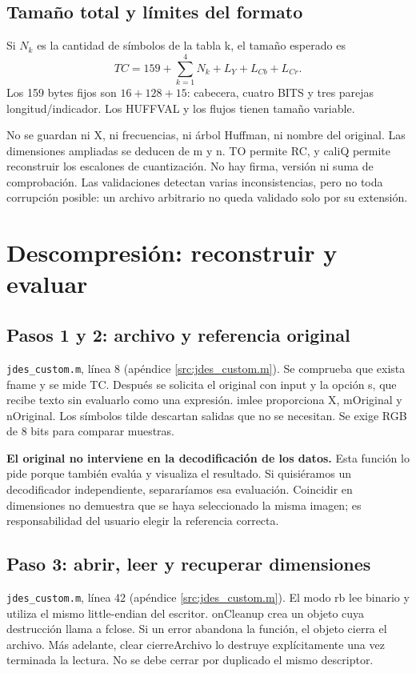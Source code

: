 \documentclass[11pt,a4paper,oneside]{report}
\begin{document}
\section{Tamaño total y límites del formato}

Si $N_k$ es la cantidad de símbolos de la tabla k, el tamaño esperado es
\[
TC=159+\sum_{k=1}^{4}N_k+L_Y+L_{Cb}+L_{Cr}.
\]
Los 159 bytes fijos son $16+128+15$: cabecera, cuatro BITS y tres parejas
longitud/indicador. Los HUFFVAL y los flujos tienen tamaño variable.

No se guardan ni X, ni frecuencias, ni árbol Huffman, ni nombre del original.
Las dimensiones ampliadas se deducen de m y n. TO permite RC, y caliQ permite
reconstruir los escalones de cuantización. No hay firma, versión ni suma de
comprobación. Las validaciones detectan varias inconsistencias, pero no toda
corrupción posible: un archivo arbitrario no queda validado solo por su extensión.


\chapter{Descompresión: reconstruir y evaluar}
\section{Pasos 1 y 2: archivo y referencia original}
\texttt{jdes\_custom.m}, línea 8 (apéndice \ref{src:jdes_custom.m}).
Se comprueba que exista fname y se mide TC. Después se solicita el original
con input y la opción s, que recibe texto sin evaluarlo como una expresión.
imlee proporciona X, mOriginal y nOriginal. Los símbolos tilde descartan
salidas que no se necesitan. Se exige RGB de 8 bits para comparar muestras.

\textbf{El original no interviene en la decodificación de los datos.} Esta función
lo pide porque también evalúa y visualiza el resultado. Si quisiéramos un
decodificador independiente, separaríamos esa evaluación. Coincidir en dimensiones
no demuestra que se haya seleccionado la misma imagen; es responsabilidad del
usuario elegir la referencia correcta.


\section{Paso 3: abrir, leer y recuperar dimensiones}
\texttt{jdes\_custom.m}, línea 42 (apéndice \ref{src:jdes_custom.m}).
El modo rb lee binario y utiliza el mismo little-endian del escritor.
onCleanup crea un objeto cuya destrucción llama a fclose. Si un error abandona
la función, el objeto cierra el archivo. Más adelante, clear cierreArchivo
lo destruye explícitamente una vez terminada la lectura. No se debe cerrar
por duplicado el mismo descriptor.
\end{document}
